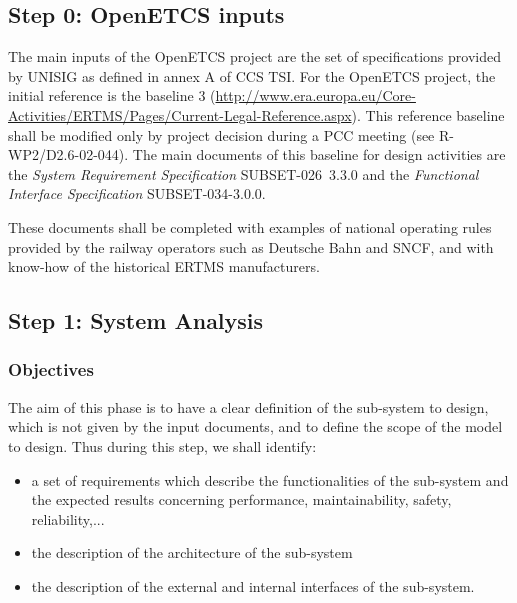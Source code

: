 
\subsection{Step 0: OpenETCS inputs}
\label{sec:inputs}


The main inputs of the OpenETCS project are the set of specifications provided by UNISIG as defined in annex A of CCS TSI. For the OpenETCS project, the initial reference is the baseline 3 (\url{http://www.era.europa.eu/Core-Activities/ERTMS/Pages/Current-Legal-Reference.aspx}). This reference baseline shall be modified only by project decision during a PCC meeting (see R-WP2/D2.6-02-044).
The main documents of this baseline for design activities are the \emph{System Requirement Specification} SUBSET-026~3.3.0 and the \textit{Functional Interface Specification} SUBSET-034-3.0.0.

These documents shall be completed with examples of national operating rules
provided by the railway operators such as Deutsche Bahn and SNCF, and with
know-how of the historical ERTMS manufacturers.




\subsection{Step 1: System Analysis}
\label{sec:sys-analysis}


\subsubsection{Objectives}
\label{sec:sys-ana-objective}

The aim of this phase is to have a clear definition of the sub-system to design, which is not given by the input documents, and to define the scope of the model to design. Thus during this step, we shall identify:

\begin{itemize}
\item a set of requirements which describe the functionalities of the sub-system and the expected results concerning performance, maintainability, safety, reliability,...
\item the description of the architecture of the sub-system
\item the description of the external and internal interfaces of the sub-system.
\end{itemize}

